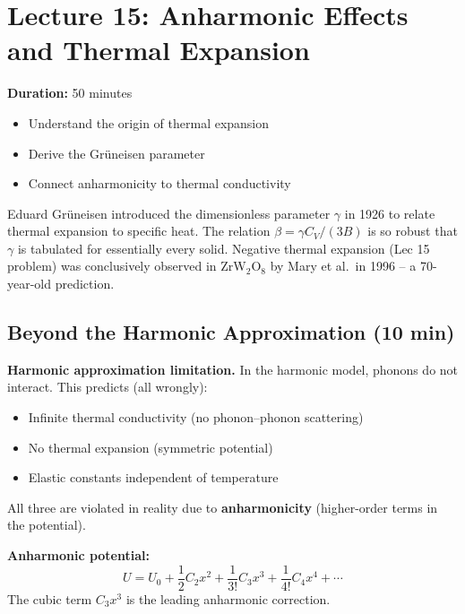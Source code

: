 \documentclass[11pt,a4paper]{article}
\newcommand{\lecheader}[3]{%
  \section{Lecture #1: #2}
  \noindent\textbf{Duration:} #3\par\vspace{4pt}
}
\begin{document}
\newpage
\lecheader{15}{Anharmonic Effects and Thermal Expansion}{50 minutes}

\begin{keybox}
\begin{itemize}
\item Understand the origin of thermal expansion
\item Derive the Gr\"uneisen parameter
\item Connect anharmonicity to thermal conductivity
\end{itemize}
\end{keybox}

\begin{histbox}
Eduard Gr\"uneisen introduced the dimensionless parameter $\gamma$ in 1926 to
relate thermal expansion to specific heat. The relation $\beta = \gamma C_V/(3B)$
is so robust that $\gamma$ is tabulated for essentially every solid. Negative
thermal expansion (Lec 15 problem) was conclusively observed in ZrW$_2$O$_8$ by
Mary et al.\ in 1996 -- a 70-year-old prediction.
\end{histbox}

\subsection{Beyond the Harmonic Approximation \hfill \small(10 min)}

\textbf{Harmonic approximation limitation.} In the harmonic model, phonons do not
interact. This predicts (all wrongly):
\begin{itemize}
\item Infinite thermal conductivity (no phonon--phonon scattering)
\item No thermal expansion (symmetric potential)
\item Elastic constants independent of temperature
\end{itemize}
All three are violated in reality due to \textbf{anharmonicity} (higher-order terms
in the potential).

\textbf{Anharmonic potential:}
\[
U = U_0 + \frac12C_2x^2 + \frac{1}{3!}C_3x^3 + \frac{1}{4!}C_4x^4 + \cdots
\]
The cubic term $C_3x^3$ is the leading anharmonic correction.
\end{document}
